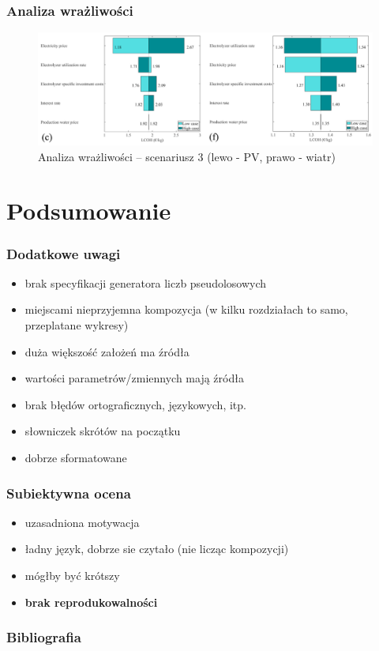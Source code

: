 \documentclass{beamer}
\newcommand\pro{\item[$+$]}
\newcommand\con{\item[$-$]}
\begin{document}
\begin{frame}[noframenumbering]
	\frametitle{Analiza wrażliwości}
	\begin{figure}
		\begin{center}
			\includegraphics[width=\textwidth]{mmc-results-tornados-3.png}
		\end{center}
		\caption{Analiza wrażliwości -- scenariusz 3 (lewo - PV, prawo - wiatr)}
	\end{figure}
\end{frame}

\section{Podsumowanie}

\begin{frame}
	\frametitle{Dodatkowe uwagi}
	\begin{itemize}
		\con brak specyfikacji generatora liczb pseudolosowych
		\con miejscami nieprzyjemna kompozycja (w kilku rozdziałach to samo,
		przeplatane wykresy)
		\pro duża większość założeń ma źródła
		\pro wartości parametrów/zmiennych mają źródła
		\pro brak błędów ortograficznych, językowych, itp.
		\pro słowniczek skrótów na początku
		\pro dobrze sformatowane
	\end{itemize}
\end{frame}

\begin{frame}
	\frametitle{Subiektywna ocena}
	\begin{itemize}
		\item uzasadniona motywacja
		\item ładny język, dobrze sie czytało (nie licząc kompozycji)
		\item mógłby być krótszy
		\item \textbf{brak reprodukowalności}
	\end{itemize}
\end{frame}

\begin{frame}
	\frametitle{Bibliografia}
	\nocite{*} %
	\printbibliography[heading=none]
\end{frame}
\end{document}
